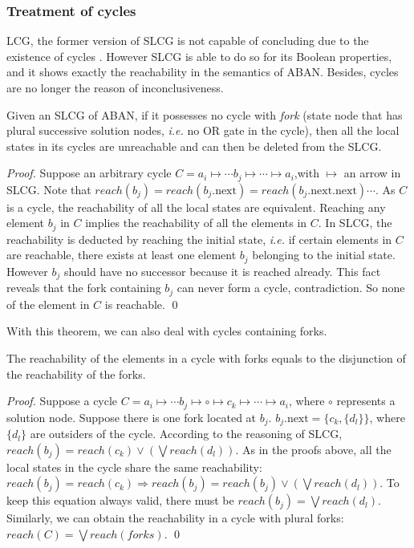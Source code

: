 \documentclass[runningheads]{llncs}
\begin{document}
\subsubsection{Treatment of cycles}
LCG, the former version of SLCG is not capable of concluding due to the existence of cycles \cite{folschette2015}. However SLCG is able to do so for its Boolean properties, and it shows exactly the reachability in the semantics of ABAN. 
Besides, cycles are no longer the reason of inconclusiveness.

\begin{theorem}\label{cycletheo}
Given an SLCG of ABAN, if it possesses no cycle with \textit{fork} (state node that has plural successive solution nodes, \textit{i.e.} no OR gate in the cycle), then all the local states in its cycles are unreachable and can then be deleted from the SLCG.
\end{theorem}

\begin{proof}
Suppose an arbitrary cycle $C=a_i\mapsto \cdots b_j\mapsto\cdots \mapsto a_i$,with $\mapsto$ an arrow in SLCG. Note that $reach(b_j)=reach(b_j.\text{next})=reach(b_j.\text{next}.\text{next})\cdots$. 
As $C$ is a cycle, the reachability of all the local states are equivalent. 
Reaching any element $b_j$ in $C$ implies the reachability of all the elements in $C$. 
In SLCG, the reachability is deducted by reaching the initial state, \textit{i.e.} if certain elements in $C$ are reachable, there exists at least one element $b_j$ belonging to the initial state. 
However $b_j$ should have no successor because it is reached already. 
This fact reveals that the fork containing $b_j$ can never form a cycle, contradiction.
So none of the element in $C$ is reachable.
\qed\end{proof}

With this theorem, we can also deal with cycles containing forks. 
\begin{lemma}\label{cyclelem}
The reachability of the elements in a cycle with forks equals to the disjunction of the reachability of the forks.
\end{lemma}

\begin{proof}
Suppose a cycle $C=a_i\mapsto \cdots b_j\mapsto \circ\mapsto c_k \mapsto\cdots \mapsto a_i$, where $\circ$ represents a solution node. 
Suppose there is one fork located at $b_j$.
$b_j.\text{next}=\{c_k,\{d_l\}\}$, where $\{d_l\}$ are outsiders of the cycle.
According to the reasoning of SLCG, $reach (b_j)=reach (c_k)\lor (\bigvee reach (d_{l}))$.
As in the proofs above, all the local states in the cycle share the same reachability: $reach (b_j)=reach (c_k)\Rightarrow reach (b_j)=reach (b_j)\lor (\bigvee reach (d_{l}))$. 
To keep this equation always valid, there must be $reach (b_j)=\bigvee reach (d_{l})$. Similarly, we can obtain the reachability in a cycle with plural forks: $reach (C)=\bigvee reach (forks)$.
\qed\end{proof}
\end{document}
